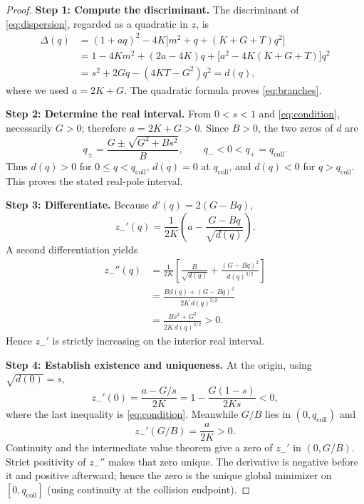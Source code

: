 \documentclass[11pt]{article}
\begin{document}
\begin{proof}
\par\medskip\noindent\textbf{Step 1: Compute the discriminant.}\enspace
The discriminant of \eqref{eq:dispersion}, regarded as a quadratic in $z$, is
\begin{align*}
 \Delta(q)
 &=(1+aq)^2-4K\bigl[m^2+q+(K+G+T)q^2\bigr]\\
 &=1-4Km^2+(2a-4K)q
   +\bigl[a^2-4K(K+G+T)\bigr]q^2\\
 &=s^2+2Gq-(4KT-G^2)q^2=d(q),
\end{align*}
where we used $a=2K+G$.  The quadratic formula proves
\eqref{eq:branches}.

\par\medskip\noindent\textbf{Step 2: Determine the real interval.}\enspace
From $0<s<1$ and \eqref{eq:condition}, necessarily $G>0$;
therefore $a=2K+G>0$. Since $B>0$, the two zeros of $d$ are
\[
 q_{\pm}=\frac{G\pm\sqrt{G^2+Bs^2}}{B},
 \qquad q_-<0<q_+=q_{\mathrm{coll}}.
\]
Thus $d(q)>0$ for $0\leq q<q_{\mathrm{coll}}$, $d(q)=0$ at
$q_{\mathrm{coll}}$, and $d(q)<0$ for $q>q_{\mathrm{coll}}$.
This proves the stated real-pole interval.

\par\medskip\noindent\textbf{Step 3: Differentiate.}\enspace
Because $d'(q)=2(G-Bq)$,
\begin{equation}\label{eq:first}
 z_-'(q)=\frac{1}{2K}
 \left(a-\frac{G-Bq}{\sqrt{d(q)}}\right).
\end{equation}
A second differentiation yields
\begin{align*}
 z_-''(q)
 &=\frac{1}{2K}\left[
 \frac{B}{\sqrt{d(q)}}
 +\frac{(G-Bq)^2}{d(q)^{3/2}}\right]\\
 &=\frac{Bd(q)+(G-Bq)^2}{2K\,d(q)^{3/2}}\\
 &=\frac{Bs^2+G^2}{2K\,d(q)^{3/2}}>0.
\end{align*}
Hence $z_-'$ is strictly increasing on the interior real interval.

\par\medskip\noindent\textbf{Step 4: Establish existence and uniqueness.}\enspace
At the origin, using $\sqrt{d(0)}=s$,
\begin{equation}\label{eq:initial}
 z_-'(0)=\frac{a-G/s}{2K}
 =1-\frac{G(1-s)}{2Ks}<0,
\end{equation}
where the last inequality is \eqref{eq:condition}.
Meanwhile $G/B$ lies in $(0,q_{\mathrm{coll}})$ and
\begin{equation}\label{eq:positive}
 z_-'(G/B)=\frac{a}{2K}>0.
\end{equation}
Continuity and the intermediate value theorem give a zero of $z_-'$
in $(0,G/B)$.  Strict positivity of $z_-''$ makes that zero unique.
The derivative is negative before it and positive afterward; hence the
zero is the unique global minimizer on
$[0,q_{\mathrm{coll}}]$ (using continuity at the collision endpoint).


\end{proof}
\end{document}
